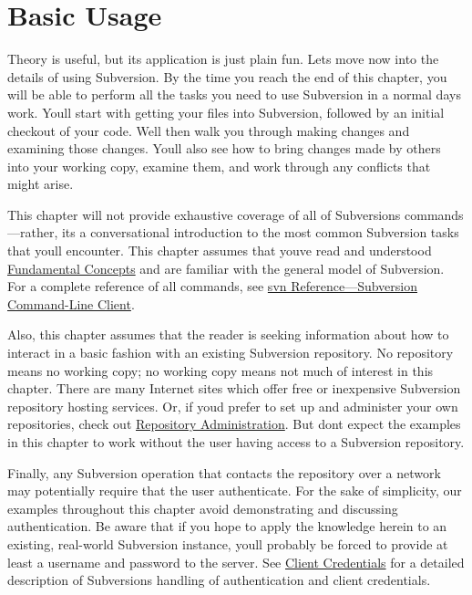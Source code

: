 \chapter{Basic Usage}\label{svn.tour}

Theory is useful, but its application is just plain fun.
Let\textquotesingle s move now into the details of using Subversion. By
the time you reach the end of this chapter, you will be able to perform
all the tasks you need to use Subversion in a normal
day\textquotesingle s work. You\textquotesingle ll start with getting
your files into Subversion, followed by an initial checkout of your
code. We\textquotesingle ll then walk you through making changes and
examining those changes. You\textquotesingle ll also see how to bring
changes made by others into your working copy, examine them, and work
through any conflicts that might arise.

This chapter will not provide exhaustive coverage of all of
Subversion\textquotesingle s commands---rather, it\textquotesingle s a
conversational introduction to the most common Subversion tasks that
you\textquotesingle ll encounter. This chapter assumes that
you\textquotesingle ve read and understood
\hyperref[svn.basic]{Fundamental Concepts} and are familiar with the
general model of Subversion. For a complete reference of all commands,
see \hyperref[svn.ref.svn]{svn Reference---Subversion Command-Line
Client}.

Also, this chapter assumes that the reader is seeking information about
how to interact in a basic fashion with an existing Subversion
repository. No repository means no working copy; no working copy means
not much of interest in this chapter. There are many Internet sites
which offer free or inexpensive Subversion repository hosting services.
Or, if you\textquotesingle d prefer to set up and administer your own
repositories, check out \hyperref[svn.reposadmin]{Repository
Administration}. But don\textquotesingle t expect the examples in this
chapter to work without the user having access to a Subversion
repository.

Finally, any Subversion operation that contacts the repository over a
network may potentially require that the user authenticate. For the sake
of simplicity, our examples throughout this chapter avoid demonstrating
and discussing authentication. Be aware that if you hope to apply the
knowledge herein to an existing, real-world Subversion instance,
you\textquotesingle ll probably be forced to provide at least a username
and password to the server. See
\hyperref[svn.serverconfig.netmodel.creds]{Client Credentials} for a
detailed description of Subversion\textquotesingle s handling of
authentication and client credentials.

